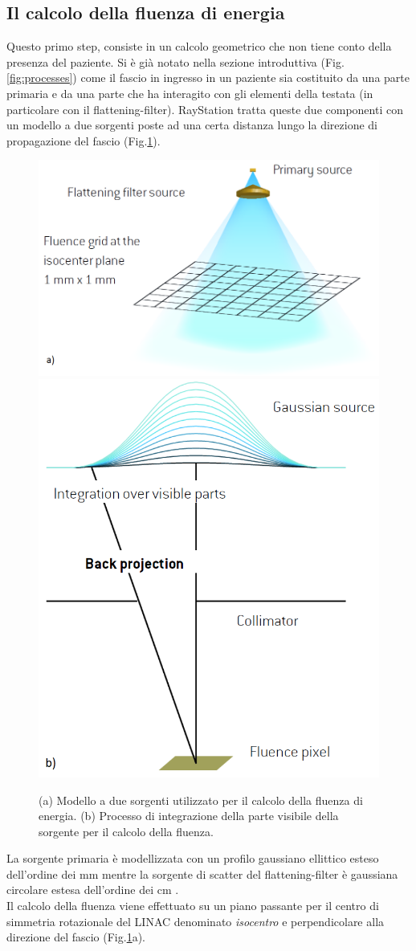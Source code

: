 {\subsection{Il calcolo della fluenza di energia}
\label{sec:fluence}
Questo primo step, consiste in un calcolo geometrico che non tiene conto della presenza del paziente. Si è già notato nella sezione introduttiva (Fig.\ref{fig:processes}) come il fascio in ingresso in un paziente sia costituito da una parte primaria e da una parte che ha interagito con gli elementi della testata (in particolare con il flattening-filter). RayStation tratta queste due componenti con un modello a due sorgenti poste ad una certa distanza lungo la direzione di propagazione del fascio (Fig.\ref{fig:twosources}).
\begin{figure}
\centering
\includegraphics[width=.55\textwidth]{./cap1/twosources.png}
\includegraphics[width=.4\textwidth]{./cap1/source_int.png}
\caption{ (a) Modello a due sorgenti utilizzato per il calcolo della fluenza di energia. (b) Processo di integrazione della parte visibile della sorgente per il calcolo della fluenza.}
\label{fig:twosources}
\end{figure}
La sorgente primaria è modellizzata con un profilo gaussiano ellittico esteso dell'ordine dei mm mentre la sorgente di scatter del flattening-filter è gaussiana circolare estesa dell'ordine dei cm \cite{Chaney1994}.\\
Il calcolo della fluenza viene effettuato su un piano passante per il centro di simmetria rotazionale del LINAC denominato \textit{isocentro} e perpendicolare alla direzione del fascio (Fig.\ref{fig:twosources}a).
}
